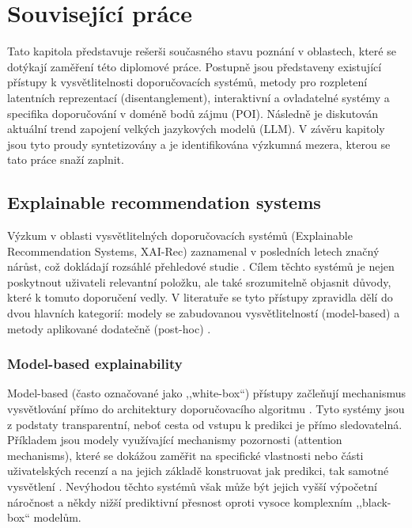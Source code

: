 \chapter{Související práce}
\label{chap:related_work}

Tato kapitola představuje rešerši současného stavu poznání v oblastech, které se dotýkají zaměření této diplomové práce. Postupně jsou představeny existující přístupy k vysvětlitelnosti doporučovacích systémů, metody pro rozpletení latentních reprezentací (disentanglement), interaktivní a ovladatelné systémy a specifika doporučování v doméně bodů zájmu (POI). Následně je diskutován aktuální trend zapojení velkých jazykových modelů (LLM). V závěru kapitoly jsou tyto proudy syntetizovány a je identifikována výzkumná mezera, kterou se tato práce snaží zaplnit.

\section{Explainable recommendation systems}
\label{sec:related_xai}

Výzkum v oblasti vysvětlitelných doporučovacích systémů (Explainable Recommendation Systems, XAI-Rec) zaznamenal v posledních letech značný nárůst, což dokládají rozsáhlé přehledové studie \cite{ZhangChen2020, Chen2022}. Cílem těchto systémů je nejen poskytnout uživateli relevantní položku, ale také srozumitelně objasnit důvody, které k tomuto doporučení vedly. V literatuře se tyto přístupy zpravidla dělí do dvou hlavních kategorií: modely se zabudovanou vysvětlitelností (model-based) a metody aplikované dodatečně (post-hoc) \cite{Abusitta2024}.

\subsection{Model-based explainability}
Model-based (často označované jako ,,white-box``) přístupy začleňují mechanismus vysvětlování přímo do architektury doporučovacího algoritmu \cite{ZhangChen2020}. Tyto systémy jsou z podstaty transparentní, neboť cesta od vstupu k predikci je přímo sledovatelná. Příkladem jsou modely využívající mechanismy pozornosti (attention mechanisms), které se dokážou zaměřit na specifické vlastnosti nebo části uživatelských recenzí a na jejich základě konstruovat jak predikci, tak samotné vysvětlení \cite{Chen2022}. Nevýhodou těchto systémů však může být jejich vyšší výpočetní náročnost a někdy nižší prediktivní přesnost oproti vysoce komplexním ,,black-box`` modelům.

